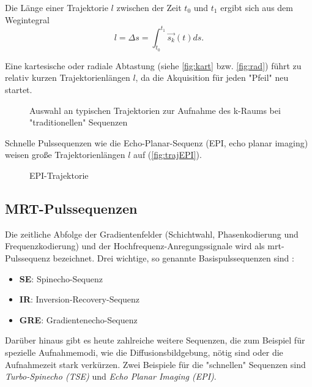 Die Länge einer Trajektorie $l$ zwischen der Zeit $t_0$ und $t_1$ ergibt sich aus dem Wegintegral
\begin{equation}
l=\Delta s = \int_{t_0}^{t_1} \vec{s_k}(t) ds.
\end{equation}

Eine kartesische oder radiale Abtastung (siehe \autoref{fig:kart} bzw. \autoref{fig:rad}) führt zu relativ kurzen Trajektorienlängen $l$, da die Akquisition für jeden "Pfeil" neu startet.

\begin{figure}[H]
	\centering
	\hfill
	\hfill
	\caption[k-Raum Trajektorien]{Auswahl an typischen Trajektorien zur Aufnahme des k-Raums bei "traditionellen" Sequenzen}
	\label{fig:trajClassic}
\end{figure}

Schnelle Pulssequenzen wie die Echo-Planar-Sequenz (EPI, echo planar imaging) weisen große Trajektorienlängen $l$ auf (\autoref{fig:trajEPI}).

\begin{figure}[H]
	\centering
	\caption[Echoplanar Sequenz]{EPI-Trajektorie}
	\label{fig:trajEPI}
\end{figure} 

\subsection{MRT-Pulssequenzen}
Die zeitliche Abfolge der Gradientenfelder (Schichtwahl, Phasenkodierung und Frequenzkodierung) und der Hochfrequenz-Anregungssignale wird als \gls{mrt}-Pulssequenz bezeichnet.
Drei wichtige, so genannte Basispulssequenzen sind \cite[S. 999]{Weishaupt2014}:
\begin{itemize}
	\item \textbf{SE}: Spinecho-Sequenz
	\item \textbf{IR}: Inversion-Recovery-Sequenz
	\item \textbf{GRE}: Gradientenecho-Sequenz
\end{itemize}

Darüber hinaus gibt es heute zahlreiche weitere Sequenzen, die zum Beispiel für spezielle Aufnahmemodi, wie die Diffusionsbildgebung, nötig sind oder die Aufnahmezeit stark verkürzen. Zwei Beispiele für die "schnellen" Sequenzen sind \textit{Turbo-Spinecho (TSE)} und \textit{Echo Planar Imaging (EPI)}.


